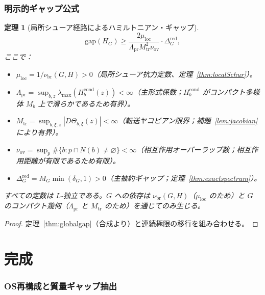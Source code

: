 \documentclass[12pt]{article}
\theoremstyle{plain}
\newtheorem{theorem}{定理}[section]
\theoremstyle{definition}
\numberwithin{equation}{section}
\newcommand{\pr}{\mathrm{pr}}
\newcommand{\loc}{\mathrm{loc}}
\newcommand{\red}{\mathrm{red}}
\newcommand{\br}{\mathrm{br}}
\newcommand{\ov}{\mathrm{ov}}
\newcommand{\tr}{\mathrm{tr}}
\begin{document}
\section{明示的ギャップ公式}\label{sec:explicitgap}

\begin{theorem}[局所シューア経路によるハミルトニアン・ギャップ]\label{thm:explicitgap}
\begin{equation}
\boxed{\mathrm{gap}(H_G) \geq \frac{2\mu_{\loc}}{\Lambda_{\pr}M_{\tr}^2\nu_{\ov}}\cdot\Delta_G^{\red},}
\end{equation}
ここで：
\begin{itemize}
\item $\mu_{\loc}=1/\nu_{\br}(G,H)>0$（局所シューア抗力定数、定理~\ref{thm:localSchur}）。
\item $\Lambda_{\pr}=\sup_{b,z}\lambda_{\max}(H_b^{\mathrm{cond}}(z))<\infty$（主形式係数；$H_b^{\mathrm{cond}}$ がコンパクト多様体 $M_b$ 上で滑らかであるため有界）。
\item $M_{\tr}=\sup_{b,\xi,z}|D\Theta_{b,\xi}(z)|<\infty$（転送ヤコビアン限界；補題~\ref{lem:jacobian}により有界）。
\item $\nu_{\ov}=\sup_p\#\{b:p\cap N(b)\neq\varnothing\}<\infty$（相互作用オーバーラップ数；相互作用距離が有限であるため有限）。
\item $\Delta_G^{\red}=M_G\min(\delta_G,1)>0$（主被約ギャップ；定理~\ref{thm:exactspectrum}）。
\end{itemize}
すべての定数は $L$-独立である。$G$ への依存は $\nu_{\br}(G,H)$（$\mu_{\loc}$ のため）と $G$ のコンパクト幾何（$\Lambda_{\pr}$ と $M_{\tr}$ のため）を通じてのみ生じる。
\end{theorem}

\begin{proof}
定理~\ref{thm:globalgap}（合成より）と連続極限の移行を組み合わせる。
\end{proof}



\part{完成}

\section{OS再構成と質量ギャップ抽出}\label{sec:OS}
\end{document}
